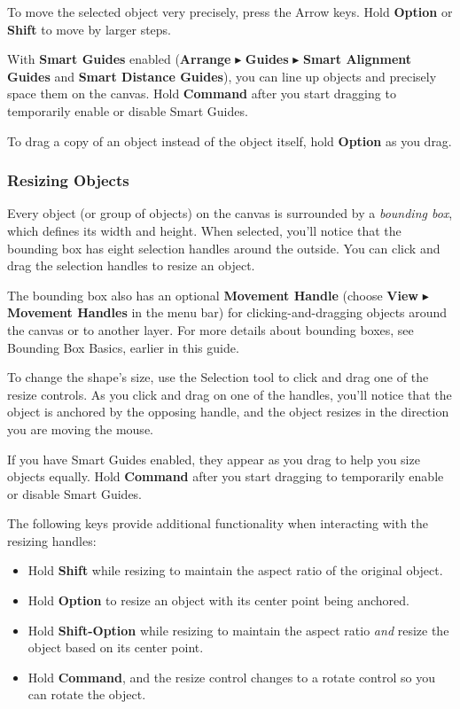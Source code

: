\documentclass[../main.tex]{subfiles}
\begin{document}
To move the selected object very precisely, press the Arrow keys. Hold \textbf{Option} or
\textbf{Shift} to move by larger steps.

With \textbf{Smart Guides} enabled (\textbf{Arrange} $\blacktriangleright$ \textbf{Guides}
$\blacktriangleright$ \textbf{Smart Alignment Guides} and \textbf{Smart Distance Guides}), you
can line up objects and precisely space them on the canvas. Hold \textbf{Command} after you
start dragging to temporarily enable or disable Smart Guides.

To drag a copy of an object instead of the object itself, hold \textbf{Option} as you drag.

\subsubsection{Resizing Objects}

Every object (or group of objects) on the canvas is surrounded by a \textit{bounding box}, which
defines its width and height. When selected, you'll notice that the bounding box has eight
selection handles around the outside. You can click and drag the selection handles to resize
an object.


The bounding box also has an optional \textbf{Movement Handle} (choose \textbf{View}
$\blacktriangleright$ \textbf{Movement Handles} in the menu bar) for clicking-and-dragging
objects around the canvas or to another layer. For more details about bounding boxes, see
Bounding Box Basics, earlier in this guide.

To change the shape's size, use the Selection tool to click and drag one of the resize controls.
As you click and drag on one of the handles, you'll notice that the object is anchored by the
opposing handle, and the object resizes in the direction you are moving the mouse.

\begin{ognote}
  If you have Smart Guides enabled, they appear as you drag to help you size objects equally. Hold
  \textbf{Command} after you start dragging to temporarily enable or disable Smart Guides.
\end{ognote}

The following keys provide additional functionality when interacting with the resizing handles:

\begin{itemize}
  \item Hold \textbf{Shift} while resizing to maintain the aspect ratio of the original object.
  \item Hold \textbf{Option} to resize an object with its center point being anchored.
  \item Hold \textbf{Shift-Option} while resizing to maintain the aspect ratio \textit{and}
    resize the object based on its center point.
  \item Hold \textbf{Command}, and the resize control changes to a rotate control so you can
    rotate the object.
\end{itemize}
\end{document}
